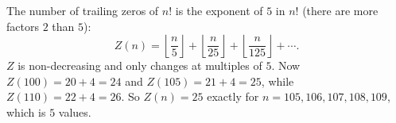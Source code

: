 The number of trailing zeros of $n!$ is the exponent of $5$ in $n!$ (there are more factors $2$ than $5$):
\[
Z(n)=\left\lfloor\dfrac {n}{5}\right\rfloor+\left\lfloor\dfrac {n}{25}\right\rfloor+\left\lfloor\dfrac {n}{125}\right\rfloor+\cdots .
\]
$Z$ is non-decreasing and only changes at multiples of $5$. Now $Z(100)=20+4=24$ and $Z(105)=21+4=25$, while $Z(110)=22+4=26$. So $Z(n)=25$ exactly for $n=105,106,107,108,109$, which is $\boxed{5}$ values.
